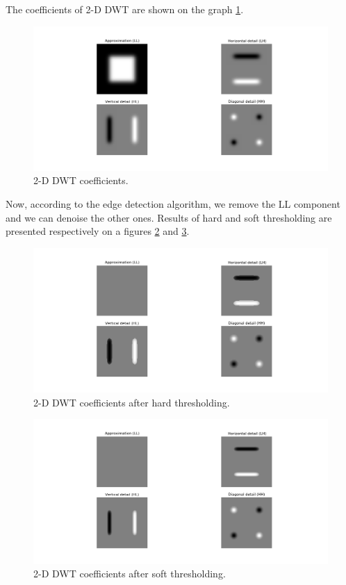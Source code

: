 The coefficients of 2-D DWT are shown on the graph \ref{fig:square_s10_coeffs}.

\begin{figure}[h]
	\centering
	\includegraphics[width=\textwidth]{graphs/square_s10_db1_coeffs.png}
	\caption{2-D DWT coefficients.}
	\label{fig:square_s10_coeffs}
\end{figure}

Now, according to the edge detection algorithm, we remove the LL component and we can denoise the other ones. Results of hard and soft thresholding are presented respectively on a figures \ref{fig:square_s10_hard_coeffs_d} and \ref{fig:square_s10_soft_coeffs_d}.

\begin{figure}[h]
	\centering
	\includegraphics[width=\textwidth]{graphs/square_s10_db1_hard_coeffs_d.png}
	\caption{2-D DWT coefficients after hard thresholding.}
	\label{fig:square_s10_hard_coeffs_d}
\end{figure}

\begin{figure}[h]
	\centering
	\includegraphics[width=\textwidth]{graphs/square_s10_db1_soft_coeffs_d.png}
	\caption{2-D DWT coefficients after soft thresholding.}
	\label{fig:square_s10_soft_coeffs_d}
\end{figure}

